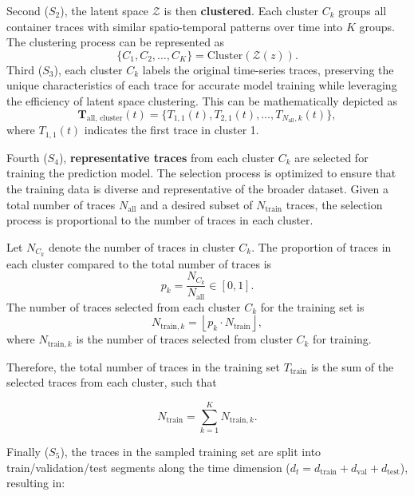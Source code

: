 Second ($S_2$), the latent space $\mathcal{Z}$ is then \textbf{clustered}. Each cluster $C_k$ groups all container traces with similar spatio-temporal patterns over time into $K$ groups. The clustering process can be represented as
\begin{equation}   
\{C_1, C_2, \ldots, C_K\} = \text{Cluster}(\mathcal{Z}(z)).
\end{equation}
Third ($S_3$), each cluster \(C_k\) labels the original time-series traces, preserving the unique characteristics of each trace for accurate model training while leveraging the efficiency of latent space clustering. This can be mathematically depicted as
\begin{equation}
\mathbf{T}_{\text{all, cluster}}(t) = \{T_{1,1}(t), T_{2,1}(t), \ldots, T_{N_\text{all},k}(t)\},
\end{equation}
where $T_{1,1}(t)$ indicates the first trace in cluster 1.

Fourth ($S_4$), \textbf{representative traces} from each cluster $C_k$ are selected for training the prediction model. The selection process is optimized to ensure that the training data is diverse and representative of the broader dataset. Given a total number of traces $N_{\text{all}}$ and a desired subset of $N_{\text{train}}$ traces, the selection process is proportional to the number of traces in each cluster.

Let $N_{C_k}$ denote the number of traces in cluster $C_k$. The proportion of traces in each cluster compared to the total number of traces is
\begin{equation}
p_k = \frac{N_{C_k}}{N_{\text{all}}} \in \left[ 0, 1 \right].
\end{equation}
The number of traces selected from each cluster $C_k$ for the training set is
\begin{equation}
N_{\text{train},k} = \left\lfloor p_k \cdot N_{\text{train}} \right\rfloor,
\end{equation}
where $N_{\text{train},k}$ is the number of traces selected from cluster $C_k$ for training.

Therefore, the total number of traces in the training set $T_{\text{train}}$ is the sum of the selected traces from each cluster, such that

\begin{equation}  
N_{\text{train}} = \sum_{k=1}^{K} N_{\text{train},k}.
\end{equation}

Finally ($S_5$), the traces in the sampled training set are split into train/validation/test segments along the time dimension ($d_t = d_{\text{train}} + d_{\text{val}} + d_{\text{test}}$), resulting in:


